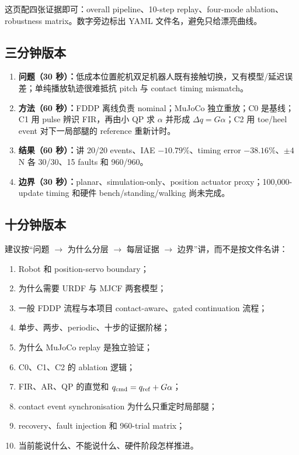 \documentclass[UTF8,11pt,a4paper]{ctexart}
\begin{document}
这页配四张证据即可：overall pipeline、10-step replay、four-mode ablation、robustness matrix。数字旁边标出 YAML 文件名，避免只给漂亮曲线。

\subsection{三分钟版本}

\begin{enumerate}
 \item \textbf{问题（30 秒）：}低成本位置舵机双足机器人既有接触切换，又有模型/延迟误差；单纯播放轨迹很难抵抗 pitch 与 contact timing mismatch。
 \item \textbf{方法（60 秒）：}FDDP 离线负责 nominal；MuJoCo 独立重放；C0 是基线；C1 用 pulse 辨识 FIR，再由小 QP 求 $\alpha$ 并形成 $\Delta q=G\alpha$；C2 用 toe/heel event 对下一局部腿的 reference 重新计时。
 \item \textbf{结果（60 秒）：}讲 20/20 events、IAE $-10.79\%$、timing error $-38.16\%$、$\pm4$ N 各 30/30、15 faults 和 960/960。
 \item \textbf{边界（30 秒）：}planar、simulation-only、position actuator proxy；100,000-update timing 和硬件 bench/standing/walking 尚未完成。
\end{enumerate}

\subsection{十分钟版本}

建议按“问题 $\rightarrow$ 为什么分层 $\rightarrow$ 每层证据 $\rightarrow$ 边界”讲，而不是按文件名讲：

\begin{enumerate}
 \item Robot 和 position-servo boundary；
 \item 为什么需要 URDF 与 MJCF 两套模型；
 \item 一般 FDDP 流程与本项目 contact-aware、gated continuation 流程；
 \item 单步、两步、periodic、十步的证据阶梯；
 \item 为什么 MuJoCo replay 是独立验证；
 \item C0、C1、C2 的 ablation 逻辑；
 \item FIR、AR、QP 的直觉和 $q_{\rm cmd}=q_{\rm ref}+G\alpha$；
 \item contact event synchronisation 为什么只重定时局部腿；
 \item recovery、fault injection 和 960-trial matrix；
 \item 当前能说什么、不能说什么、硬件阶段怎样推进。
\end{enumerate}
\end{document}
